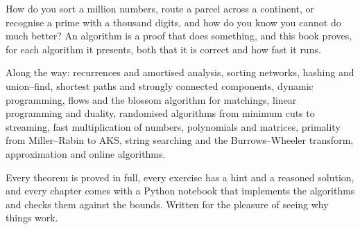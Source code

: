 How do you sort a million numbers, route a parcel across a continent, or recognise a prime with a thousand digits,
and how do you know you cannot do much better? An algorithm is a proof that does something, and this book proves,
for each algorithm it presents, both that it is correct and how fast it runs.

Along the way: recurrences and amortised analysis, sorting networks, hashing and union--find, shortest paths and
strongly connected components, dynamic programming, flows and the blossom algorithm for matchings, linear programming
and duality, randomised algorithms from minimum cuts to streaming, fast multiplication of numbers, polynomials and
matrices, primality from Miller--Rabin to AKS, string searching and the Burrows--Wheeler transform, approximation and
online algorithms.

Every theorem is proved in full, every exercise has a hint and a reasoned solution, and every chapter comes with a
Python notebook that implements the algorithms and checks them against the bounds. Written for the pleasure of seeing
why things work.
